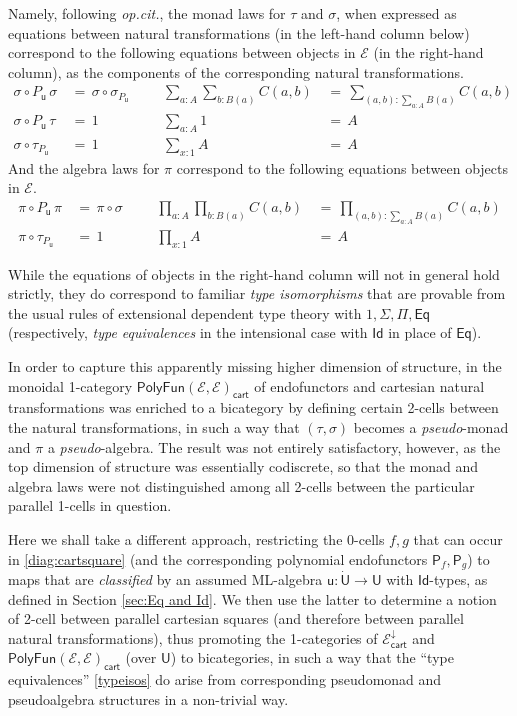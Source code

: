 \documentclass[12pt,reqno]{amsart}
\newcommand{\EE}{\ensuremath{\mathcal{E}}}
\newcommand{\alg}[1]{\ensuremath{\mathsf{#1}}}
\renewcommand{\to}{\ensuremath{\rightarrow}}
\newcommand{\Id}{\mathsf{Id}}
\renewcommand{\t}{\ensuremath{\mathsf{u}}}
\newcommand{\T}{\ensuremath{\mathsf{U}}}
\newcommand{\TT}{\ensuremath{\dot{\mathsf{U}}}}
\theoremstyle{remark}
\theoremstyle{definition}
\begin{document}
Namely, following \emph{op.cit.}, the monad laws for $\tau$ and $\sigma$, when expressed as equations between natural transformations (in the left-hand column below) correspond to the following equations between objects in $\EE$ (in the right-hand column), as the components of the corresponding natural transformations.
\begin{align*}\textstyle
 \sigma\circ P_\t\, \sigma\, &=\, \sigma\circ\sigma_{P_\t}	&&&	\sum\limits_{a:A}\sum\limits_{b:B(a)}C(a,b)\, &=\, \sum\limits_{(a,b):\sum\limits_{a:A}B(a)}C(a,b)\  \\ 
  \sigma\circ P_\t\,\tau\, &=\, 1 		&&& 	\sum\limits_{a:A}1\, &=\, A   \tag{\theequation}\label{typeisos}\\ 
  \sigma\circ \tau_{P_\t}\, &=\, 1		&&& 	\sum\limits_{x:1}A\, &=\, A  
 \end{align*}
%
And the algebra laws for $\pi$ correspond to the following equations between objects in $\EE$.
%
\begin{align*}
 \pi\circ P_\t\,\pi\, &=\,  \pi\circ\sigma 	&&&	\prod\limits_{a:A}\prod\limits_{b:B(a)}C(a,b)\, 
 									&=\, \prod\limits_{(a,b):\sum_{a:A}B(a)}C(a,b)  \\ 
 \pi\circ \tau_{P_\t}\, &=\, 1 	&&& 	\prod\limits_{x:1}A\, &=\, A   \tag{\theequation}
\end{align*}

While the equations of objects in the right-hand column will not in general hold strictly, they do correspond to familiar \emph{type isomorphisms} that are provable from the usual rules of extensional dependent type theory with $1, \Sigma, \Pi, \mathsf{Eq}$ (respectively, \emph{type equivalences} in the intensional case with $\mathsf{Id}$ in place of $\mathsf{Eq}$). 

In order to capture this apparently missing higher dimension of structure, in \cite{Newstead:thesis, NA:2018} the monoidal 1-category $\mathsf{PolyFun}(\EE, \EE)_{\mathsf{cart}}$ of endofunctors and cartesian natural transformations was enriched to a bicategory by defining certain 2-cells between the natural transformations, in such a way that $(\tau, \sigma)$ becomes a \emph{pseudo}-monad and $\pi$ a \emph{pseudo}-algebra.  The result was not entirely satisfactory, however, as the top dimension of structure was essentially codiscrete, so that the monad and algebra laws were not distinguished among all 2-cells between the particular parallel 1-cells in question.

Here we shall take a different approach, restricting the 0-cells $f, g$ that can occur in \eqref{diag:cartsquare} (and the corresponding polynomial endofunctors $\alg{P}_f, \alg{P}_g$) to maps that are  \emph{classified} by an assumed ML-algebra $\t:\TT \to \T$ with $\Id{}$-types, as defined in Section \ref{sec:Eq and Id}. We then use the latter to determine a notion of 2-cell between parallel cartesian squares (and therefore between parallel natural transformations), thus promoting the 1-categories of $\EE^{\downarrow}_{\mathsf{cart}}$ and $\mathsf{PolyFun}(\EE, \EE)_{\mathsf{cart}}$ (over $\T$) to bicategories, in such a way that the ``type equivalences'' \eqref{typeisos} do arise from corresponding pseudomonad and pseudoalgebra structures in a non-trivial way.
\end{document}
